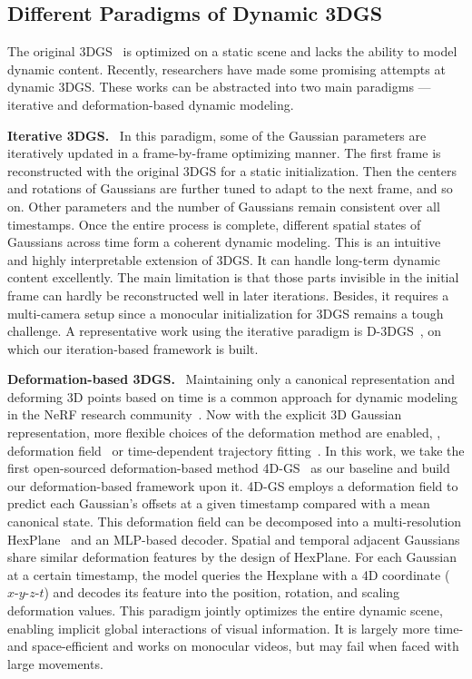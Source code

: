 \documentclass[runningheads]{llncs}
\newcommand{\parsection}[1]{\noindent\textbf{#1.}~}
\begin{document}
\subsection{Different Paradigms of Dynamic 3DGS}

The original 3DGS~\cite{3dgs} is optimized on a static scene and lacks the ability to model dynamic content.
Recently, researchers have made some promising attempts at dynamic 3DGS. These works can be abstracted into two main paradigms --- iterative and deformation-based dynamic modeling.

\parsection{Iterative 3DGS}
In this paradigm, some of the Gaussian parameters are iteratively updated in a frame-by-frame optimizing manner. The first frame is reconstructed with the original 3DGS for a static initialization. Then the centers and rotations of Gaussians are further tuned to adapt to the next frame, and so on. Other parameters and the number of Gaussians remain consistent over all timestamps. Once the entire process is complete, different spatial states of Gaussians across time form a coherent dynamic modeling.
This is an intuitive and highly interpretable extension of 3DGS. It can handle long-term dynamic content excellently. The main limitation is that those parts invisible in the initial frame can hardly be reconstructed well in later iterations. Besides, it requires a multi-camera setup since a monocular initialization for 3DGS remains a tough challenge.
A representative work using the iterative paradigm is D-3DGS~\cite{d3dgs}, on which our iteration-based framework is built.

\parsection{Deformation-based 3DGS}
Maintaining only a canonical representation and deforming 3D points based on time is a common approach for dynamic modeling in the NeRF research community~\cite{dnerf,nerfies}. Now with the explicit 3D Gaussian representation, more flexible choices of the deformation method are enabled, \eg, deformation field~\cite{4dgs,yang2023deformable} or time-dependent trajectory fitting~\cite{katsumata2023efficient}.
In this work, we take the first open-sourced deformation-based method 4D-GS~\cite{4dgs} as our baseline and build our deformation-based framework upon it. 4D-GS employs a deformation field to predict each Gaussian's offsets at a given timestamp compared with a mean canonical state. This deformation field can be decomposed into a multi-resolution HexPlane~\cite{hexplane} and an MLP-based decoder. Spatial and temporal adjacent Gaussians share similar deformation features by the design of HexPlane. For each Gaussian at a certain timestamp, the model queries the Hexplane with a 4D coordinate ($x\text{-}y\text{-}z\text{-}t$) and decodes its feature into the position, rotation, and scaling deformation values. 
This paradigm jointly optimizes the entire dynamic scene, enabling implicit global interactions of visual information. 
It is largely more time- and space-efficient and works on monocular videos, but may fail when faced with large movements.
\end{document}
